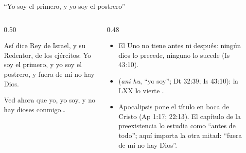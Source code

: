 \begin{frame}{``Yo soy el primero, y yo soy el postrero''}
\begin{columns}[t,onlytextwidth]
\begin{column}{0.50\textwidth}
\begin{center}\small{}\end{center}
\begin{cita}Así dice \SENOR{} Rey de Israel, y su Redentor, \SENOR{} de los ejércitos: Yo soy el primero, y yo soy el postrero, y fuera de mí no hay Dios.\end{cita}
\begin{cita}[fontupper=\scriptsize\itshape]Ved ahora que yo, yo soy, y no hay dioses conmigo\ldots{}\end{cita}
\end{column}
\begin{column}{0.48\textwidth}\small
\begin{itemize}
\item El Uno no tiene antes ni después: ningún dios lo precede, ninguno lo sucede (Is 43:10).
\item {} (\emph{aní hu}, ``yo soy''; Dt 32:39; Is 43:10): la LXX lo vierte .
\item Apocalipsis pone el título en boca de Cristo (Ap 1:17; 22:13). El capítulo de la preexistencia lo estudia como ``antes de todo''; aquí importa la otra mitad: ``fuera de mí no hay Dios''.
\end{itemize}
\end{column}
\end{columns}
\end{frame}

